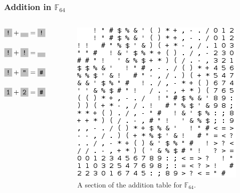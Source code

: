 \documentclass{beamer}
\begin{document}
\begin{frame}
	\frametitle{Addition in $\mathbb{F}_{64}$}
	
	\begin{columns}[T]
	
	\begin{column}{.5\textwidth}
	\begin{block}{}
     $\f{!} + \f{ } = \f{!}$\\~\\
	 $\f{!} + \f{!} = \f{ }$\\~\\
	 $\f{!} + \f{"} = \f{\#}$\\~\\
     $\f{1} + \f{2} = \f{\#}$\\~\\
	\end{block}
	\end{column}	
	
	\begin{column}{.5\textwidth}
	\begin{block}{}
		\begin{figure}
	\includegraphics[height=0.5\textheight]{AddTableSection.png}
	\caption{A section of the addition table for $\mathbb{F}_{64}$.}
	\label{fig:Add}
	\end{figure}
	\end{block}
	\end{column}
   
\end{columns}
\end{frame}
\end{document}
